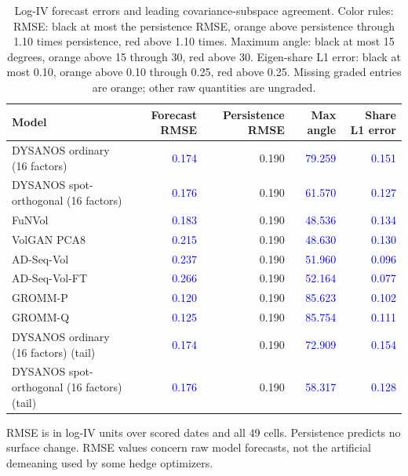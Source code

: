 \documentclass[11pt]{article}
\begin{document}
\begin{table}[H]\centering\small\setlength{\tabcolsep}{4pt}
\caption{Log-IV forecast errors and leading covariance-subspace agreement. Color rules: RMSE: black at most the persistence RMSE, orange above persistence through 1.10 times persistence, red above 1.10 times. Maximum angle: black at most 15 degrees, orange above 15 through 30, red above 30. Eigen-share L1 error: black at most 0.10, orange above 0.10 through 0.25, red above 0.25. Missing graded entries are orange; other raw quantities are ungraded.}\label{tab:forecast-subspace}
\begin{tabular}{@{}lrrrr@{}}
\toprule
Model & Forecast RMSE & Persistence RMSE & Max angle & Share L1 error \\
\midrule
DYSANOS ordinary (16 factors) & \textcolor{blue}{0.174} & 0.190 & \textcolor{blue}{79.259} & \textcolor{blue}{0.151} \\
DYSANOS spot-orthogonal (16 factors) & \textcolor{blue}{0.176} & 0.190 & \textcolor{blue}{61.570} & \textcolor{blue}{0.127} \\
FuNVol & \textcolor{blue}{0.183} & 0.190 & \textcolor{blue}{48.536} & \textcolor{blue}{0.134} \\
VolGAN PCA8 & \textcolor{blue}{0.215} & 0.190 & \textcolor{blue}{48.630} & \textcolor{blue}{0.130} \\
AD-Seq-Vol & \textcolor{blue}{0.237} & 0.190 & \textcolor{blue}{51.960} & \textcolor{blue}{0.096} \\
AD-Seq-Vol-FT & \textcolor{blue}{0.266} & 0.190 & \textcolor{blue}{52.164} & \textcolor{blue}{0.077} \\
GROMM-P & \textcolor{blue}{0.120} & 0.190 & \textcolor{blue}{85.623} & \textcolor{blue}{0.102} \\
GROMM-Q & \textcolor{blue}{0.125} & 0.190 & \textcolor{blue}{85.754} & \textcolor{blue}{0.111} \\
DYSANOS ordinary (16 factors) (tail) & \textcolor{blue}{0.174} & 0.190 & \textcolor{blue}{72.909} & \textcolor{blue}{0.154} \\
DYSANOS spot-orthogonal (16 factors) (tail) & \textcolor{blue}{0.176} & 0.190 & \textcolor{blue}{58.317} & \textcolor{blue}{0.128} \\
\bottomrule\end{tabular}\end{table}

RMSE is in log-IV units over scored dates and all 49 cells. Persistence predicts no surface change. RMSE values concern raw model forecasts, not the artificial demeaning used by some hedge optimizers.
\end{document}
